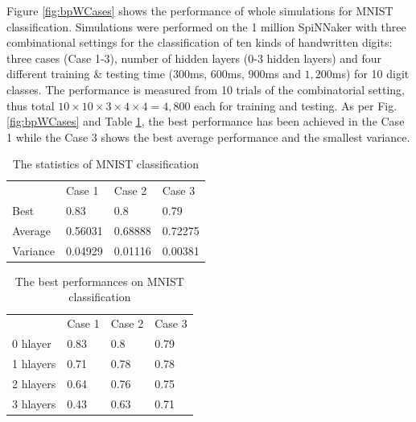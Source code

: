 \documentclass[letterpaper, 10 pt, conference]{ieeeconf}  %
\begin{document}
Figure \ref{fig:bpWCases} shows the performance of whole simulations for MNIST classification.
Simulations were performed on the 1 million SpiNNaker \cite{brown2018spinnaker} with three combinational settings for the classification of ten kinds of handwritten digits: three cases (Case 1-3), number of hidden layers (0-3 hidden layers) and four different training \& testing time ($300$ms, $600$ms, $900$ms and $1,200$ms) for 10 digit classes. The performance is measured from 10 trials of the combinatorial setting, thus total $10 \times 10 \times 3 \times 4 \times 4 = 4,800$ each for training and testing. As per Fig. \ref{fig:bpWCases} and Table \ref{tab:sim_stat}, the best performance has been achieved in the Case 1 while the Case 3 shows the best average performance and the smallest variance. 


\setlength{\tabcolsep}{4pt}
\begin{table}
\setlength{\tabcolsep}{12pt} %
\begin{center}
\caption{The statistics of MNIST classification}
\label{tab:sim_stat}
\begin{tabular}{ llll }
\hline\noalign{\smallskip}
     ~          & Case 1    & Case 2    & Case 3    \\ 
\noalign{\smallskip}
\hline
\noalign{\smallskip}    
    Best 	    & 0.83	    & 0.8 	    & 0.79      \\ %
    Average 	& 0.56031	& 0.68888 	& 0.72275   \\ %
    Variance 	& 0.04929	& 0.01116	& 0.00381   \\ %
\hline
\end{tabular}
\end{center}
\end{table}
\setlength{\tabcolsep}{1.4pt}


\setlength{\tabcolsep}{4pt}
\begin{table}
\setlength{\tabcolsep}{12pt} %
\begin{center}
\caption{The best performances on MNIST classification}
\label{tab:sim_best}
\begin{tabular}{ llll }
\hline\noalign{\smallskip}
     ~          & Case 1    & Case 2    & Case 3    \\ 
\noalign{\smallskip}
\hline
\noalign{\smallskip}    
    0 hlayer 	& 0.83	    & 0.8	    & 0.79   \\
    1 hlayers 	& 0.71  	& 0.78   	& 0.78   \\
    2 hlayers	& 0.64  	& 0.76  	& 0.75   \\
    3 hlayers 	& 0.43  	& 0.63  	& 0.71   \\
\hline
\end{tabular}
\end{center}
\end{table}
\setlength{\tabcolsep}{1.4pt}
\end{document}
